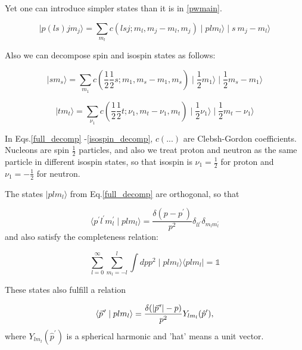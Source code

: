     Yet one can introduce simpler states than it is in \ref{pwmain}.
    
    \begin{equation}
        \mid p (ls) j m_j \rangle = \sum_{m_l} c(lsj;m_l, m_j\!-\!m_l, m_j) \mid p l m_l \rangle
        \mid s~m_j\!-\!m_l \rangle
        \label{full_decomp}
    \end{equation}

    Also we can decompose spin and isospin states as follows:

    \begin{equation}
        \mid s m_s \rangle = \sum_{m_1} c(\frac{1}{2}\frac{1}{2}s;m_1, m_s\!-\!m_1, m_s)
        \mid \frac{1}{2} m_1 \rangle
        \mid \frac{1}{2} m_s\!-\!m_1 \rangle
        \label{spin_decomp}
    \end{equation}

    \begin{equation}
        \mid t m_t \rangle = \sum_{\nu_1} c(\frac{1}{2}\frac{1}{2}t;\nu_1, m_t\!-\!\nu_1, m_t)
        \mid \frac{1}{2} \nu_1 \rangle
        \mid \frac{1}{2} m_t\!-\!\nu_1 \rangle
        \label{isospin_decomp}
    \end{equation}

    In Eqs.\ref{full_decomp} -\ref{isospin_decomp},  $c(...)$ are Clebsh-Gordon coefficients.
    Nucleons are spin $\frac{1}{2}$ particles, and also we treat proton and neutron as 
    the same particle in different 
    isospin states, so that isospin is $\nu_1 = \frac{1}{2}$ for proton and $\nu_1 = -\frac{1}{2}$ for neutron.

    The states $\mid p l m_l \rangle$ from Eq.\ref{full_decomp} are orthogonal, so that
    
    \begin{equation}
        \langle p^\prime l^\prime m_l^\prime \mid p l m_l \rangle = 
        \frac{\delta(p - p^\prime)}{p^2} \delta_{ll^\prime}\delta_{m_l m_l^\prime}
    \end{equation}
    and also satisfy the completeness relation:

    \begin{equation}
        \sum_{l=0}^\infty \sum_{m_l=-l}^l \int dp p^2 \mid plm_l \rangle \langle plm_l \mid = \mathbb{1}
    \end{equation}


    These states also fulfill a relation

    \begin{equation}
        \langle \pvec{p} \mid plm_l \rangle = 
        \frac{\delta ( \abs{\pvec{p}} - p)}{p^2} Y _{l m_l}(\hat{p}^\prime),
    \end{equation}
    where $Y _{l m_l}(\hat{p}^\prime)$ is a spherical harmonic and 'hat' means a unit vector.

